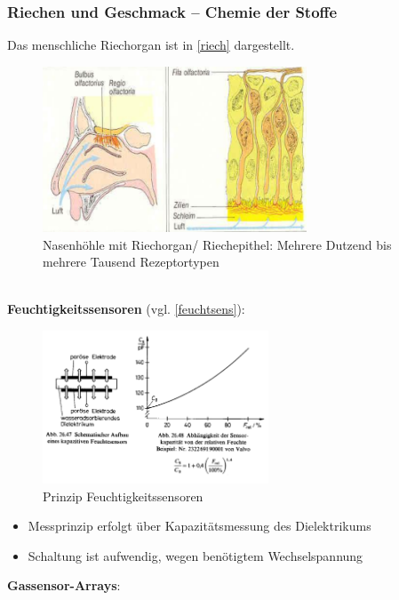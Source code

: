 \subsubsection{Riechen und Geschmack – Chemie der Stoffe}
Das menschliche Riechorgan ist in \autoref{riech} dargestellt.
\begin{figure}[h!]
	\centering
	\includegraphics[width=0.7\textwidth]{figures/ch04_riech.png}
	\caption{Nasenhöhle mit Riechorgan/ Riechepithel: Mehrere Dutzend bis mehrere Tausend Rezeptortypen}
	\label{riech}
\end{figure}\\
\textbf{Feuchtigkeitssensoren} (vgl. \autoref{feuchtsens}):
\begin{figure}[h!]
	\centering
	\includegraphics[width=0.6\textwidth]{figures/ch04_feuchtsens.png}
	\caption{Prinzip Feuchtigkeitssensoren}
	\label{feuchtsens}
\end{figure}
\begin{itemize}
\item Messprinzip erfolgt über Kapazitätsmessung des Dielektrikums
\item Schaltung ist aufwendig, wegen benötigtem Wechselspannung
\end{itemize}
\newpage
\textbf{Gassensor-Arrays}:
